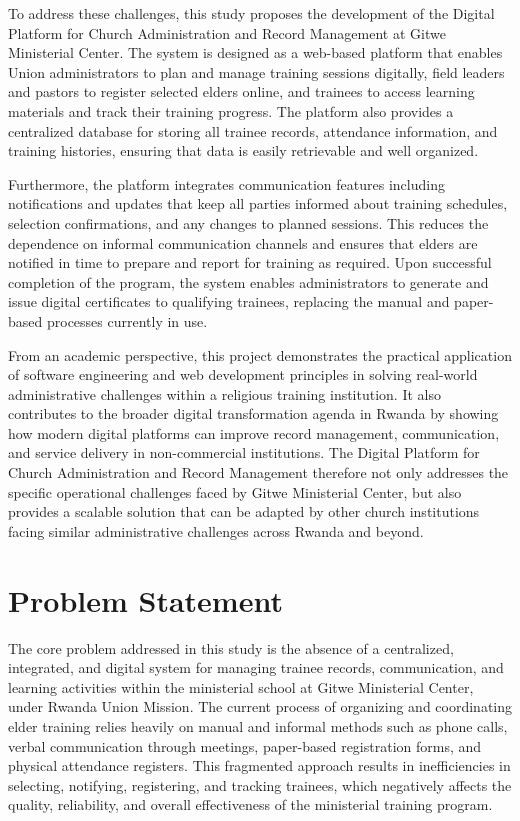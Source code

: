 \documentclass[12pt]{report}
\begin{document}
To address these challenges, this study proposes the development of the Digital Platform for Church Administration and Record Management at Gitwe Ministerial Center. The system is designed as a web-based platform that enables Union administrators to plan and manage training sessions digitally, field leaders and pastors to register selected elders online, and trainees to access learning materials and track their training progress. The platform also provides a centralized database for storing all trainee records, attendance information, and training histories, ensuring that data is easily retrievable and well organized.

Furthermore, the platform integrates communication features including notifications and updates that keep all parties informed about training schedules, selection confirmations, and any changes to planned sessions. This reduces the dependence on informal communication channels and ensures that elders are notified in time to prepare and report for training as required. Upon successful completion of the program, the system enables administrators to generate and issue digital certificates to qualifying trainees, replacing the manual and paper-based processes currently in use.

From an academic perspective, this project demonstrates the practical application of software engineering and web development principles in solving real-world administrative challenges within a religious training institution. It also contributes to the broader digital transformation agenda in Rwanda by showing how modern digital platforms can improve record management, communication, and service delivery in non-commercial institutions. The Digital Platform for Church Administration and Record Management therefore not only addresses the specific operational challenges faced by Gitwe Ministerial Center, but also provides a scalable solution that can be adapted by other church institutions facing similar administrative challenges across Rwanda and beyond.

\section{Problem Statement}
The core problem addressed in this study is the absence of a centralized, integrated, and digital system for managing trainee records, communication, and learning activities within the ministerial school at Gitwe Ministerial Center, under Rwanda Union Mission. The current process of organizing and coordinating elder training relies heavily on manual and informal methods such as phone calls, verbal communication through meetings, paper-based registration forms, and physical attendance registers. This fragmented approach results in inefficiencies in selecting, notifying, registering, and tracking trainees, which negatively affects the quality, reliability, and overall effectiveness of the ministerial training program.
\end{document}
